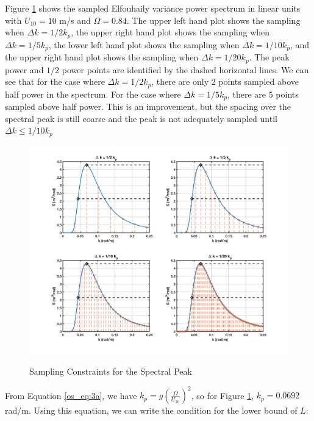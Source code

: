 Figure \ref{os_fig:6ba} shows the sampled Elfouhaily variance power spectrum in linear units with $U_{10} = 10$ m/s and $\Omega = 0.84$.  The upper left hand plot shows the sampling when $\Delta k = 1/2 k_p$, the upper right hand plot shows the sampling when $\Delta k = 1/5 k_p$, the lower left hand plot shows the sampling when $\Delta k = 1/10 k_p$, and the upper right hand plot shows the sampling when $\Delta k = 1/20 k_p$. The peak power and $1/2$ power points are identified by the dashed horizontal lines. We can see that for the case where $\Delta k = 1/2 k_p$, there are only $2$ points sampled above half power in the spectrum. For the case where $\Delta k = 1/5 k_p$, there are $5$ points sampled above half power. This is an improvement, but the spacing over the spectral peak is still coarse and the peak is not adequately sampled until $\Delta k \leq 1/10 k_p$

\begin{figure}[H]
  \begin{center}
\includegraphics[width=6in]{../media/Ocean_Surface/spectral_peak_sampling.png}
  \end{center}
  \renewcommand{\baselinestretch}{1} \small\normalsize
  \begin{quote}
    \caption[Sampling Constraints for the Spectral Peak]{Sampling Constraints for the Spectral Peak\label{os_fig:6ba}}
  \end{quote}
\end{figure}
\renewcommand{\baselinestretch}{2} \small\normalsize

From Equation \ref{os_eq:3a}, we have $k_p = g\left(\frac{\Omega}{U_{10}}\right)^2$, so for Figure \ref{os_fig:6ba}, $k_p = 0.0692$ rad/m. Using this equation, we can write the condition for the lower bound of $L$:

